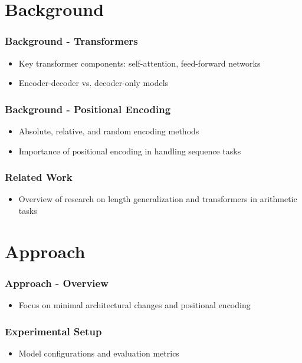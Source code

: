 \documentclass[14pt,aspectratio=169]{beamer}
\theoremstyle{remark}
\begin{document}
\section{Background}

\begin{frame}
    \frametitle{Background - Transformers}
    \begin{itemize}
        \item Key transformer components: self-attention, feed-forward networks
        \item Encoder-decoder vs. decoder-only models
    \end{itemize}
\end{frame}

\begin{frame}
    \frametitle{Background - Positional Encoding}
    \begin{itemize}
        \item Absolute, relative, and random encoding methods
        \item Importance of positional encoding in handling sequence tasks
    \end{itemize}
\end{frame}

\begin{frame}
    \frametitle{Related Work}
    \begin{itemize}
        \item Overview of research on length generalization and transformers in arithmetic tasks
    \end{itemize}
\end{frame}

\section{Approach}

\begin{frame}
    \frametitle{Approach - Overview}
    \begin{itemize}
        \item Focus on minimal architectural changes and positional encoding
    \end{itemize}
\end{frame}

\begin{frame}
    \frametitle{Experimental Setup}
    \begin{itemize}
        \item Model configurations and evaluation metrics
    \end{itemize}
\end{frame}
\end{document}
